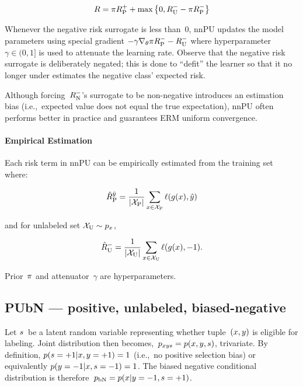 \begin{equation}\label{eq:Risk:nnPU}
  R = \pi R_{\textnormal{P}}^{{+}} + \max\left\{0, R_{\textnormal{U}}^{{-}} - \pi R_{\textnormal{P}}^{{-}} \right\}
\end{equation}

Whenever the negative risk surrogate is less than~0, nnPU updates the model parameters using special gradient ${-\gamma \nabla_{\theta} \pi R_{\textnormal{P}}^{{-}} - R_{\textnormal{U}}^{{-}}}$ where hyperparameter~${\gamma \in (0,1]}$ is used to attenuate the learning rate.  Observe that the negative risk surrogate is deliberately negated; this is done to ``defit'' the learner so that it no longer under estimates the negative class' expected risk.

Although forcing~$R_{\textnormal{N}}^{{-}}$'s surrogate to be non-negative introduces an estimation bias (i.e.,~expected value does not equal the true expectation), nnPU often performs better in practice and guarantees ERM uniform convergence.

\paragraph{Empirical Estimation} Each risk term in nnPU can be empirically estimated from the training set where:

\begin{equation}\label{eq:EmpRisk:Pos}
  \hat{R}_{\textnormal{P}}^{\hat{y}} = \frac{1}{\lvert\mathcal{X}_{\textnormal{P}}\rvert} \sum_{x \in \mathcal{X}_{\textnormal{P}}} \ell\mathopen{}\left(g\mathopen{}\left(x\right)\mathclose{},\hat{y}\right)\mathclose{}
\end{equation}

\noindent
and for unlabeled set ${\mathcal{X}_{\textnormal{U}} \sim p_{x}}$,

\begin{equation}
  \hat{R}_{\textnormal{U}}^{-} = \frac{1}{\lvert\mathcal{X}_{\textnormal{U}}\rvert} \sum_{x \in \mathcal{X}_{\textnormal{U}}} \ell\mathopen{}\left(g\mathopen{}\left(x\right)\mathclose{},{-}1\right)\mathclose{} \text{.}
\end{equation}

\noindent
Prior~$\pi$ and attenuator~$\gamma$ are hyperparameters.

\subsection{PUbN --- positive, unlabeled, biased-negative}

Let $s$~be a latent random variable representing whether tuple~${(x,y)}$ is eligible for labeling.  Joint distribution then becomes,~${p_{xys} = p(x, y, s)}$, trivariate.  By definition, ${p(s = {+}1 \vert x, y = {+}1) = 1}$ (i.e.,~no positive selection bias) or equivalently ${p(y = {-}1 \vert x, s = {-}1) = 1}$.  The biased negative conditional distribution is therefore~${p_{\textnormal{bN}} = p(x \vert y = {-}1, s = {+}1)}$.

